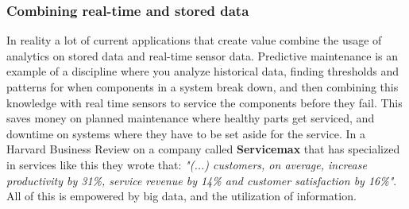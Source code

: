 \documentclass[a4paper,english]{report}
\begin{document}
				\subsubsection{Combining real-time and stored data}
				In reality a lot of current applications that create value combine the usage of analytics on stored data and real-time sensor data. Predictive maintenance is an example of a discipline where you analyze historical data, finding thresholds and patterns for when components in a system break down, and then combining this knowledge with real time sensors to service the components before they fail. This saves money on planned maintenance where healthy parts get serviced, and downtime on systems where they have to be set aside for the service. In a Harvard Business Review on a company called \textbf{Servicemax} that has specialized in services like this they wrote that:
				\textit{"(...) customers, on average, increase productivity by 31\%, service revenue by 14\% and customer satisfaction by 16\%"}\cite{servicemax}. All of this is empowered by big data, and the utilization of information.
			
\end{document}
